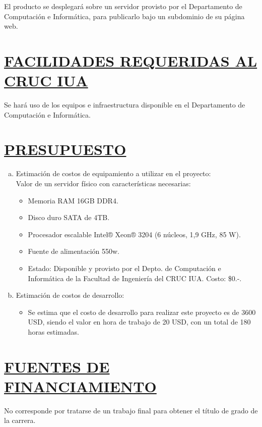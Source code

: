 El producto se desplegará sobre un servidor provisto por el Departamento de Computación e Informática, para publicarlo bajo un subdominio de su página web.\\

\section*{\underline{FACILIDADES REQUERIDAS AL CRUC IUA}}
Se hará uso de los equipos e infraestructura disponible en el Departamento de Computación e Informática.\\


\section*{\underline{PRESUPUESTO}}
\begin{enumerate}[(a)]
	\item Estimación de costos de equipamiento a utilizar en el proyecto:\\
Valor de un servidor físico con características necesarias:

		\begin{itemize}
			\item Memoria RAM 16GB DDR4.
			\item Disco duro SATA de 4TB.
			\item Procesador escalable Intel® Xeon® 3204 (6 núcleos, 1,9 GHz, 85 W).
			\item Fuente de alimentación 550w.
			\item Estado: Disponible y provisto por el Depto. de Computación e Informática de la Facultad de Ingeniería del CRUC IUA. Costo: \$0.-.
		\end{itemize}

	\item Estimación de costos de desarrollo:
		\begin{itemize}
			\item Se estima que el costo de desarrollo para realizar este proyecto es de 3600 USD, siendo el valor en hora de trabajo de 20 USD, con un total de 180 horas estimadas.\\
		\end{itemize}
\end{enumerate}

\section*{\underline{FUENTES DE FINANCIAMIENTO}}
No corresponde por tratarse de un trabajo final para obtener el título de grado de la carrera.\\

